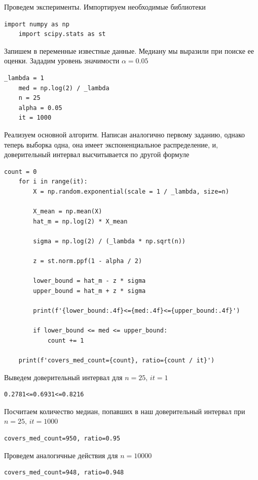 \documentclass[a4paper, 12pt]{article}
\begin{document}
    Проведем эксперименты. Импортируем необходимые библиотеки
    \begin{lstlisting}[label=imps2, caption={Импорт необходимых библиотек}]
    import numpy as np
    import scipy.stats as st
    \end{lstlisting}
    Запишем в переменные известные данные. Медиану мы выразили при поиске ее оценки. Зададим уровень
    значимости $\alpha=0.05$
    \begin{lstlisting}[label=vars2, caption={Запись известных параметров в переменные}]
    _lambda = 1
    med = np.log(2) / _lambda
    n = 25
    alpha = 0.05
    it = 1000
    \end{lstlisting}
    Реализуем основной алгоритм. Написан аналогично первому заданию, однако теперь выборка одна, она
    имеет экспоненциальное распределение, и, доверительный интервал высчитывается по другой формуле
    \begin{lstlisting}[label=code2, caption={Реализация алгоритма для задания 2}]
    count = 0
    for i in range(it):
        X = np.random.exponential(scale = 1 / _lambda, size=n)

        X_mean = np.mean(X)
        hat_m = np.log(2) * X_mean

        sigma = np.log(2) / (_lambda * np.sqrt(n))

        z = st.norm.ppf(1 - alpha / 2)

        lower_bound = hat_m - z * sigma
        upper_bound = hat_m + z * sigma

        print(f'{lower_bound:.4f}<={med:.4f}<={upper_bound:.4f}')

        if lower_bound <= med <= upper_bound:
            count += 1

    print(f'covers_med_count={count}, ratio={count / it}')
    \end{lstlisting}


    Выведем доверительный интервал для $n=25,\,it=1$
    \begin{lstlisting}[label=int2, caption={Доверительный интервал для $n=25$}]
    0.2781<=0.6931<=0.8216
    \end{lstlisting}
    Посчитаем количество медиан, попавших в наш доверительный интервал при $n=25,\,it=1000$
    \begin{lstlisting}[label=n25_2, caption={Количество медиан внутри интервала и отношение при $n=25$}]
    covers_med_count=950, ratio=0.95
    \end{lstlisting}
    Проведем аналогичные действия для $n=10000$
    \begin{lstlisting}[label=n10000_2, caption={Количество медиан внутри интервала и отношение при $n=10000$}]
    covers_med_count=948, ratio=0.948
    \end{lstlisting}
\end{document}
